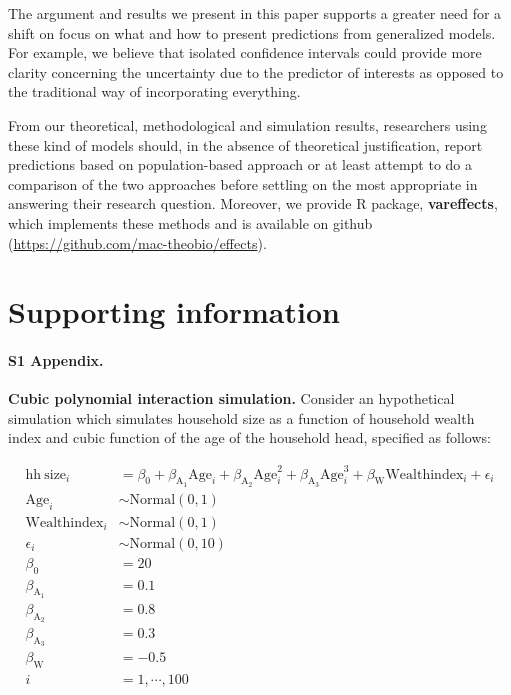 \documentclass[10pt,letterpaper]{article}
\newcommand{\pkg}[1]{\textbf{#1}}
\let\proglang=\textsf
\begin{document}
The argument and results we present in this paper supports a greater need for a shift on focus on what and how to present predictions from generalized models. For example, we believe that isolated confidence intervals could provide more clarity concerning the uncertainty due to the predictor of interests as opposed to the traditional way of incorporating everything. 

From our theoretical, methodological and simulation results, researchers using these kind of models should, in the absence of theoretical justification, report predictions based on population-based approach or at least attempt to do a comparison of the two approaches before settling on the most appropriate in answering their research question. Moreover, we provide \proglang{R} package, \pkg{vareffects}, which implements these methods and is available on github (\href{https://github.com/mac-theobio/effects}{https://github.com/mac-theobio/effects}).

\section*{Supporting information}

\paragraph*{S1 Appendix.}
\label{S1_Appendix}
{\bf Cubic polynomial interaction simulation.} Consider an hypothetical simulation which simulates household size as a function of household wealth index and cubic function of the age of the household head, specified as follows:

\begin{align}\label{sim:lm_cubic}
\mathrm{hh~size}_i &= \beta_0 + \beta_{\mathrm{A_1}}\mathrm{Age}_i + \beta_{\mathrm{A_2}}\mathrm{Age}^2_i + \beta_{\mathrm{A_3}}\mathrm{Age}^3_i + \beta_{\mathrm{W}}\mathrm{Wealthindex}_i + \epsilon_i \nonumber\\
\mathrm{Age}_i &\sim \mathrm{Normal}(0, 1) \nonumber\\
\mathrm{Wealthindex}_i &\sim \mathrm{Normal}(0, 1) \nonumber\\
\epsilon_i &\sim \mathrm{Normal}(0, 10) \nonumber\\
\beta_0 &= 20 \nonumber\\
\beta_{\mathrm{A}_1} &= 0.1 \nonumber\\
\beta_{\mathrm{A}_2} &= 0.8 \nonumber\\
\beta_{\mathrm{A}_3} &= 0.3 \nonumber\\
\beta_{\mathrm{W}} &= -0.5 \nonumber\\
i &= 1,\cdots, 100
\end{align}
\end{document}
